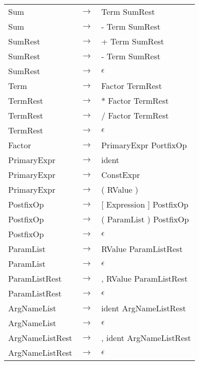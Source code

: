 \documentclass[10pt,a4paper]{article}
\begin{document}
\begin{longtable}{ l c l }
	Sum              & $\rightarrow$ & Term SumRest \\
	Sum              & $\rightarrow$ & - Term SumRest \\

	SumRest          & $\rightarrow$ & + Term SumRest \\
	SumRest          & $\rightarrow$ & - Term SumRest \\
	SumRest          & $\rightarrow$ & $\epsilon$ \\
	
	Term             & $\rightarrow$ & Factor TermRest \\
	
	TermRest         & $\rightarrow$ & * Factor TermRest \\
	TermRest         & $\rightarrow$ & / Factor TermRest \\
	TermRest         & $\rightarrow$ & $\epsilon$ \\

	Factor           & $\rightarrow$ & PrimaryExpr PortfixOp \\
	
	PrimaryExpr      & $\rightarrow$ & ident \\
	PrimaryExpr      & $\rightarrow$ & ConstExpr \\
	PrimaryExpr      & $\rightarrow$ & ( RValue ) \\

	PostfixOp        & $\rightarrow$ & [ Expression ] PostfixOp \\
	PostfixOp        & $\rightarrow$ & ( ParamList ) PostfixOp \\
	PostfixOp        & $\rightarrow$ & $\epsilon$ \\

	ParamList        & $\rightarrow$ & RValue ParamListRest \\
	ParamList        & $\rightarrow$ & $\epsilon$ \\

	ParamListRest    & $\rightarrow$ & , RValue ParamListRest \\
	ParamListRest    & $\rightarrow$ & $\epsilon$ \\
	
	ArgNameList      & $\rightarrow$ & ident ArgNameListRest \\
	ArgNameList      & $\rightarrow$ & $\epsilon$ \\
	
	ArgNameListRest  & $\rightarrow$ & , ident ArgNameListRest \\
	ArgNameListRest  & $\rightarrow$ & $\epsilon$ \\
\end{longtable}
\end{document}
